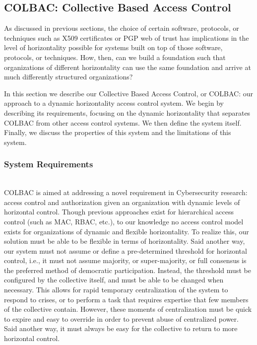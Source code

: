 \subsection{COLBAC: Collective Based Access Control}
\label{sec:colbac}
As discussed in previous sections, the choice of certain software, protocols, or
techniques such as X509 certificates or PGP web of trust has implications in the
level of horizontality possible for systems built on top of those software,
protocols, or techniques. How, then, can we build a foundation such that
organizations of different horizontality can use the same foundation and arrive
at much differently structured organizations?

In this section we describe our Collective Based Access Control, or COLBAC: our
approach to a dynamic horizontality access control system. We begin by
describing its requirements, focusing on the dynamic horizontality that
separates COLBAC from other access control systems. We then define the system
itself. Finally, we discuss the properties of this system and the limitations of
this system.

\subsubsection{System Requirements}
\label{sec:colbacrequirements}
\mbox{}\\
COLBAC is aimed at addressing a novel requirement in Cybersecurity research:
access control and authorization given an organization with dynamic levels of
horizontal control. Though previous approaches exist for hierarchical access
control (such as MAC, RBAC, etc.), to our knowledge no access control model
exists for organizations of dynamic and flexible horizontality. To realize
this, our solution must be able to be flexible in terms of horizontality. Said
another way, our system must not assume or define a pre-determined threshold for
horizontal control, i.e., it must not assume majority, or super-majority, or
full consensus is the preferred method of democratic participation. Instead,
the threshold must be configured by the collective itself, and must be able to
be changed when necessary. This allows for rapid temporary centralization of the
system to respond to crises, or to perform a task that requires expertise that
few members of the collective contain. However, these moments of centralization
must be quick to expire and easy to override in order to prevent abuse of
centralized power. Said another way, it must always be easy for the collective
to return to more horizontal control.

